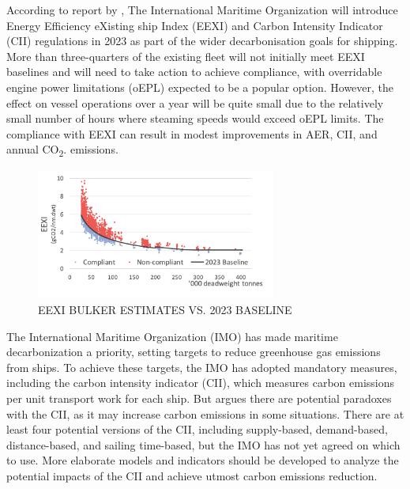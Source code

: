 According to report by \citeauthor{stevenson_2021_bulker} \autocite{stevenson_2021_bulker}, The International Maritime Organization will introduce Energy Efficiency eXisting ship Index (EEXI) and Carbon Intensity Indicator (CII) regulations in 2023 as part of the wider decarbonisation goals for shipping. More than three-quarters of the existing fleet will not initially meet EEXI baselines and will need to take action to achieve compliance, with overridable engine power limitations (oEPL) expected to be a popular option. However, the effect on vessel operations over a year will be quite small due to the relatively small number of hours where steaming speeds would exceed oEPL limits. The compliance with EEXI can result in modest improvements in AER, CII, and annual CO\textsubscript{2}. emissions.

\begin{figure}[h]
    \centering
    \includegraphics[width=0.7\textwidth]{images/eexi_non_compliant.png}
    \caption{EEXI BULKER ESTIMATES VS. 2023 BASELINE}
    \label{eexiNonCompliant}
\end{figure}


The International Maritime Organization (IMO) has made maritime decarbonization a priority, setting targets to reduce greenhouse gas emissions from ships.
To achieve these targets, the IMO has adopted mandatory measures, including the carbon intensity indicator (CII), which measures carbon emissions per unit transport work for each ship.
But \citeauthor{WANG2021100005} \autocite{WANG2021100005} argues there are potential paradoxes with the CII, as it may increase carbon emissions in some situations.
There are at least four potential versions of the CII, including supply-based, demand-based, distance-based, and sailing time-based, but the IMO has not yet agreed on which to use.
More elaborate models and indicators should be developed to analyze the potential impacts of the CII and achieve utmost carbon emissions reduction.

